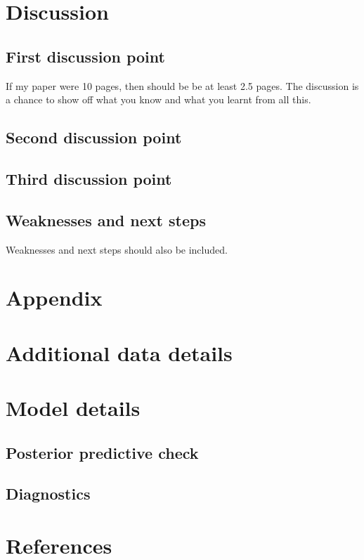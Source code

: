 \documentclass[
  letterpaper,
  DIV=11,
  numbers=noendperiod]{scrartcl}
\begin{document}
\section{Discussion}\label{discussion}

\subsection{First discussion point}\label{sec-first-point}

If my paper were 10 pages, then should be be at least 2.5 pages. The
discussion is a chance to show off what you know and what you learnt
from all this.

\subsection{Second discussion point}\label{second-discussion-point}

\subsection{Third discussion point}\label{third-discussion-point}

\subsection{Weaknesses and next steps}\label{weaknesses-and-next-steps}

Weaknesses and next steps should also be included.

\newpage

\appendix

\section*{Appendix}\label{appendix}

\section{Additional data details}\label{additional-data-details}

\section{Model details}\label{sec-model-details}

\subsection{Posterior predictive
check}\label{posterior-predictive-check}

\subsection{Diagnostics}\label{diagnostics}

\newpage

\section{References}\label{references}
\end{document}
